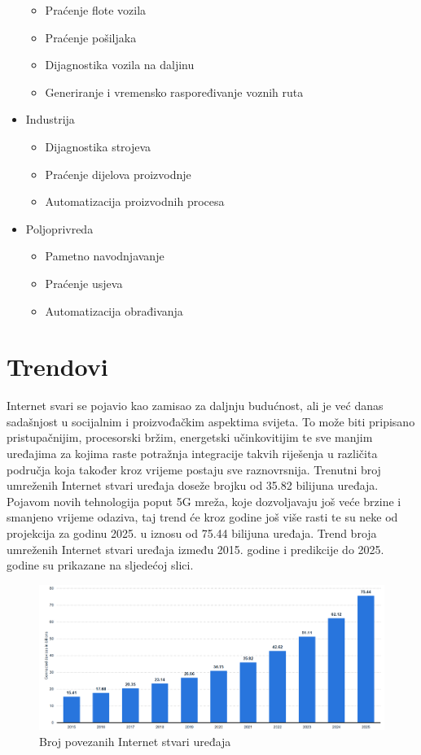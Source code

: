\documentclass[times, utf8, diplomski]{fer}
\begin{document}
\begin{itemize}
    \begin{itemize}
        \item Praćenje flote vozila
        \item Praćenje pošiljaka
        \item Dijagnostika vozila na daljinu
        \item Generiranje i vremensko raspoređivanje voznih ruta
    \end{itemize}
    \item Industrija
    \begin{itemize}
        \item Dijagnostika strojeva
        \item Praćenje dijelova proizvodnje
        \item Automatizacija proizvodnih procesa
    \end{itemize}
    \item Poljoprivreda
    \begin{itemize}
        \item Pametno navodnjavanje
        \item Praćenje usjeva
        \item Automatizacija obrađivanja
    \end{itemize}
\end{itemize}

\section{Trendovi}
Internet svari se pojavio kao zamisao za daljnju budućnost, ali je već danas sadašnjost u socijalnim i proizvođačkim aspektima svijeta. To može biti pripisano pristupačnijim, procesorski bržim, energetski učinkovitijim te sve manjim uređajima za kojima raste potražnja integracije takvih riješenja u različita područja koja također kroz vrijeme postaju sve raznovrsnija. Trenutni broj umreženih Internet stvari uređaja doseže brojku od 35.82 bilijuna uređaja. Pojavom novih tehnologija poput 5G mreža, koje dozvoljavaju još veće brzine i smanjeno vrijeme odaziva, taj trend će kroz godine još više rasti te su neke od projekcija za godinu 2025. u iznosu od 75.44 bilijuna uređaja\citep{IotNumber}. Trend broja umreženih Internet stvari uređaja između 2015. godine i predikcije do 2025. godine su prikazane na sljedećoj slici. 
\begin{figure}[H]
    \centering
    \includegraphics[width=14cm]{images/number-of-installed-iot.png}
    \caption{Broj povezanih Internet stvari uređaja\citep{IotNumber}}
    \label{fig:iotdevices}
\end{figure}
\end{document}
